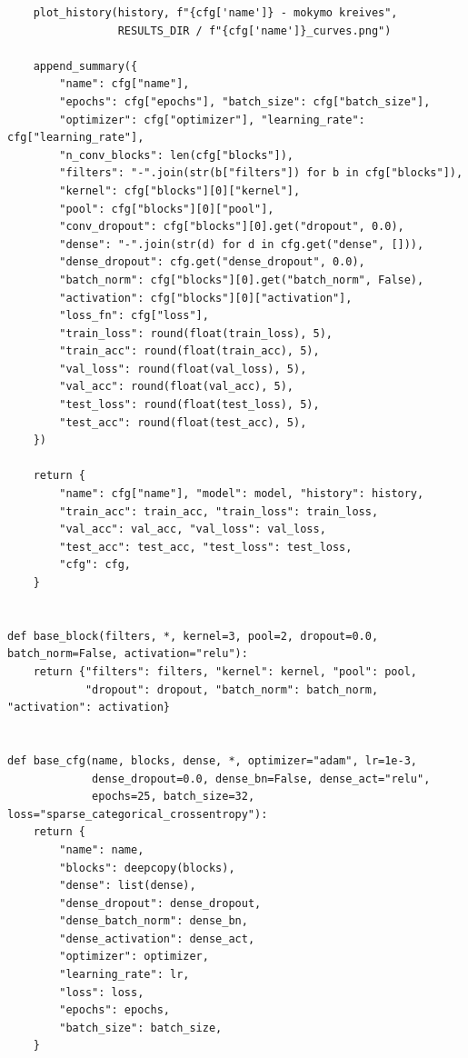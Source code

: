\documentclass[]{VUMIFTemplateClass}
\begin{document}
\begin{verbatim}
    plot_history(history, f"{cfg['name']} - mokymo kreives",
                 RESULTS_DIR / f"{cfg['name']}_curves.png")

    append_summary({
        "name": cfg["name"],
        "epochs": cfg["epochs"], "batch_size": cfg["batch_size"],
        "optimizer": cfg["optimizer"], "learning_rate": cfg["learning_rate"],
        "n_conv_blocks": len(cfg["blocks"]),
        "filters": "-".join(str(b["filters"]) for b in cfg["blocks"]),
        "kernel": cfg["blocks"][0]["kernel"],
        "pool": cfg["blocks"][0]["pool"],
        "conv_dropout": cfg["blocks"][0].get("dropout", 0.0),
        "dense": "-".join(str(d) for d in cfg.get("dense", [])),
        "dense_dropout": cfg.get("dense_dropout", 0.0),
        "batch_norm": cfg["blocks"][0].get("batch_norm", False),
        "activation": cfg["blocks"][0]["activation"],
        "loss_fn": cfg["loss"],
        "train_loss": round(float(train_loss), 5),
        "train_acc": round(float(train_acc), 5),
        "val_loss": round(float(val_loss), 5),
        "val_acc": round(float(val_acc), 5),
        "test_loss": round(float(test_loss), 5),
        "test_acc": round(float(test_acc), 5),
    })

    return {
        "name": cfg["name"], "model": model, "history": history,
        "train_acc": train_acc, "train_loss": train_loss,
        "val_acc": val_acc, "val_loss": val_loss,
        "test_acc": test_acc, "test_loss": test_loss,
        "cfg": cfg,
    }


def base_block(filters, *, kernel=3, pool=2, dropout=0.0, batch_norm=False, activation="relu"):
    return {"filters": filters, "kernel": kernel, "pool": pool,
            "dropout": dropout, "batch_norm": batch_norm, "activation": activation}


def base_cfg(name, blocks, dense, *, optimizer="adam", lr=1e-3,
             dense_dropout=0.0, dense_bn=False, dense_act="relu",
             epochs=25, batch_size=32, loss="sparse_categorical_crossentropy"):
    return {
        "name": name,
        "blocks": deepcopy(blocks),
        "dense": list(dense),
        "dense_dropout": dense_dropout,
        "dense_batch_norm": dense_bn,
        "dense_activation": dense_act,
        "optimizer": optimizer,
        "learning_rate": lr,
        "loss": loss,
        "epochs": epochs,
        "batch_size": batch_size,
    }



\end{verbatim}
\end{document}
